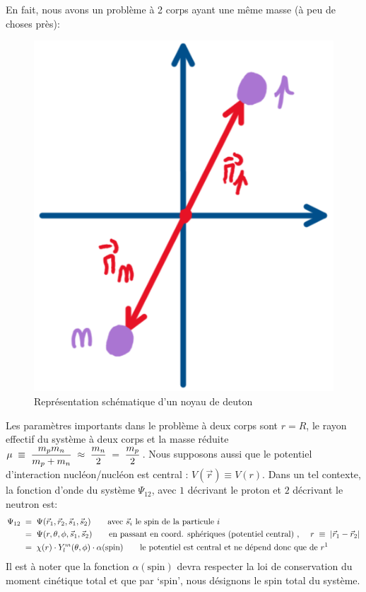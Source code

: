 En fait, nous avons un problème à 2 corps ayant une même masse (à peu de choses près):
\begin{figure}[H]
    \centering
    \includegraphics[scale=0.3]{Images4/noyau_deuton.png}
    \caption{Représentation schématique d'un noyau de deuton}
\end{figure}
Les paramètres importants dans le problème à deux corps sont $r=R$, le rayon effectif du système à deux corps et la masse réduite $\mu \;\equiv\; \dfrac{m_pm_n}{m_p+m_n} \;\approx\; \dfrac{m_n}{2} \; = \; \dfrac{m_p}{2}$. Nous supposons aussi que le potentiel d'interaction nucléon/nucléon est central : $V(\vec{r})\equiv V(r)$. Dans un tel contexte, la fonction d'onde du système $\Psi_{12}$, avec $1$ décrivant le proton et $2$ décrivant le neutron est:
\begin{align*}
    \Psi_{12} &\eq
    \Psi(\vec{r}_1,\vec{r}_2,\vec{s}_1,\vec{s}_2) \qquad \text{avec $\vec{s}_i$ le spin de la particule $i$}\\
    &\eq
    \Psi(r,\theta,\phi,\vec{s}_1,\vec{s}_2)   \qquad \text{en passant en coord. sphériques (potentiel central) , } \quad r \;\equiv\; |\vec{r}_1-\vec{r}_2|\\
    &\eq
    \chi(r) \cdot Y^m_l(\theta,\phi) \cdot \alpha(\text{spin}) \qquad \text{le potentiel est central et ne dépend donc que de $r$\footnotemark}
\end{align*}
Il est à noter que la fonction $\alpha(\text{spin})$ devra respecter la loi de conservation du moment cinétique total et que par `spin', nous désignons le spin total du système.\\



